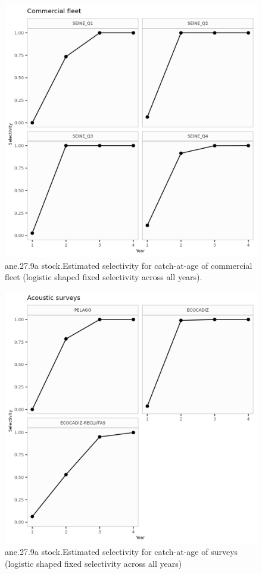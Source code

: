 \documentclass[
]{article}
\begin{document}
\begin{figure}[H]

{\centering \includegraphics[width=0.95\linewidth]{report/run/S1.0_4FLEETS/fig_Sel_commercial_fleet} 

}

\caption{ane.27.9a stock.Estimated selectivity for catch-at-age of commercial fleet (logistic shaped fixed selectivity across all years).}\label{fig:unnamed-chunk-35}
\end{figure}

\begin{figure}[H]

{\centering \includegraphics[width=0.95\linewidth]{report/run/S1.0_4FLEETS/fig_Sel_surveys} 

}

\caption{ane.27.9a stock.Estimated selectivity for catch-at-age of surveys (logistic shaped fixed selectivity across all years)}\label{fig:unnamed-chunk-36}
\end{figure}
\end{document}
